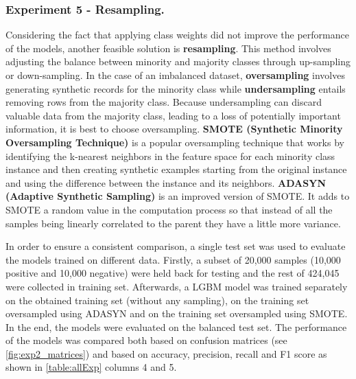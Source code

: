 \documentclass[runningheads]{llncs}
\begin{document}
\subsubsection{Experiment 5 - Resampling.}
\label{section:exp_5}
Considering the fact that applying class weights did not improve the performance of the models, another feasible solution is \textbf{resampling}.
This method involves adjusting the balance between minority and majority classes through up-sampling or down-sampling. In the case of an imbalanced dataset, \textbf{oversampling} involves generating synthetic records for the minority class while \textbf{undersampling} entails removing rows from the majority class. 
Because undersampling can discard valuable data from the majority class, leading to a loss of potentially important information, it is best to choose oversampling. 
\textbf{SMOTE (Synthetic Minority Oversampling Technique)} 
\cite{smote2019}
is a popular oversampling technique that works by identifying the k-nearest neighbors in the feature space for each minority class instance and then creating synthetic examples starting from the original instance and using the difference between the instance and its neighbors. 
\textbf{ADASYN (Adaptive Synthetic Sampling)} 
\cite{adasyn2008}
is an improved version of SMOTE. It adds to SMOTE a random value in the computation process so that instead of all the samples being linearly correlated to the parent they have a little more variance. 

In order to ensure a consistent comparison, a single test set was used to evaluate the models trained on different data. Firstly, a subset of 20,000 samples (10,000 positive and 10,000 negative) were held back for testing and the rest of 424,045 were collected in training set. Afterwards, a LGBM model was trained separately on the obtained training set (without any sampling), on the training set oversampled using ADASYN and on the training set oversampled using SMOTE. In the end, the models were evaluated on the balanced test set. The performance of the models was compared both based on confusion matrices (see \autoref{fig:exp2_matrices}) and based on accuracy, precision, recall and F1 score as shown in \autoref{table:allExp} columns 4 and 5. 
\end{document}
